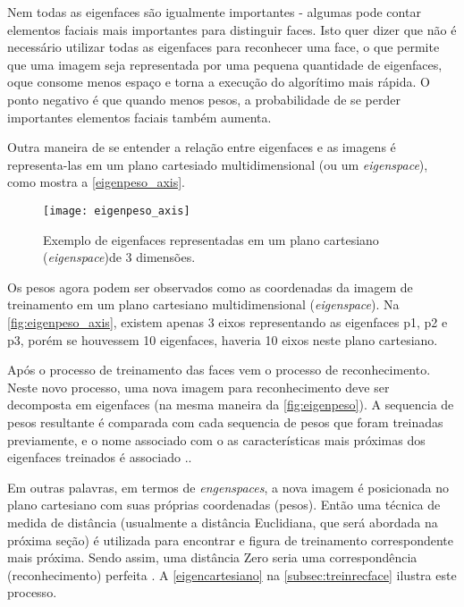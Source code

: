 Nem todas as eigenfaces são igualmente importantes - algumas pode contar elementos faciais mais importantes para distinguir faces. Isto quer dizer que não é necessário utilizar todas as eigenfaces para reconhecer uma face, o que permite que uma imagem seja representada por uma pequena quantidade de eigenfaces, oque consome menos espaço e torna a execução do algorítimo mais rápida. O ponto negativo é que quando menos pesos, a probabilidade de se perder importantes elementos faciais também aumenta\cite{drmathew_java_programming}.

Outra maneira de se entender a relação entre eigenfaces e as imagens é representa-las em um plano cartesiado multidimensional (ou um \textit{eigenspace}), como mostra a \autoref{eigenpeso_axis}.

\begin{figure}[h]
	\centering
	\texttt{[image: eigenpeso\_axis]}
	\caption{Exemplo de eigenfaces representadas em um plano cartesiano (\textit{eigenspace})de 3 dimensões. }
	\label{fig:eigenpeso_axis}
\end{figure}

Os pesos agora podem ser observados como as coordenadas da imagem de treinamento em um plano cartesiano multidimensional (\textit{eigenspace}). Na \autoref{fig:eigenpeso_axis}, existem apenas 3 eixos representando as eigenfaces p1, p2 e p3, porém se houvessem 10 eigenfaces, haveria 10 eixos neste plano cartesiano.

Após o processo de treinamento das faces vem o processo de reconhecimento. Neste novo processo, uma nova imagem para reconhecimento deve ser decomposta em eigenfaces (na mesma maneira da \autoref{fig:eigenpeso}). A sequencia de pesos resultante é comparada com cada sequencia de pesos que foram treinadas previamente, e o nome associado com o as características mais próximas dos eigenfaces treinados é associado \cite{drmathew_java_programming}..

Em outras palavras, em termos de \textit{engenspaces}, a nova imagem é posicionada no plano cartesiano com suas próprias coordenadas (pesos). Então uma técnica de medida de distância (usualmente a distância Euclidiana, que será abordada na próxima seção) é utilizada para encontrar e figura de treinamento correspondente mais próxima. Sendo assim, uma distância Zero seria uma correspondência (reconhecimento) perfeita \cite{drmathew_java_programming}. A \autoref{eigencartesiano} na \autoref{subsec:treinrecface} ilustra este processo.

